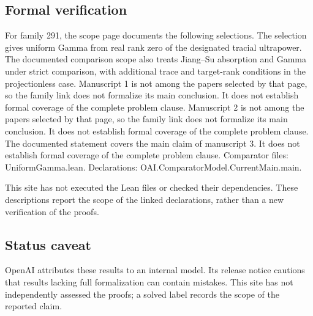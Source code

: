 \documentclass[11pt]{article}
\begin{document}
\subsection{Formal verification}
For family 291, the scope page documents the following selections. The selection gives uniform Gamma from real rank zero of the designated tracial ultrapower. The documented comparison scope also treats Jiang--Su absorption and Gamma under strict comparison, with additional trace and target-rank conditions in the projectionless case. Manuscript 1 is not among the papers selected by that page, so the family link does not formalize its main conclusion. It does not establish formal coverage of the complete problem clause. Manuscript 2 is not among the papers selected by that page, so the family link does not formalize its main conclusion. It does not establish formal coverage of the complete problem clause. The documented statement covers the main claim of manuscript 3. It does not establish formal coverage of the complete problem clause. Comparator files: UniformGamma.lean. Declarations: OAI.ComparatorModel.CurrentMain.main.

This site has not executed the Lean files or checked their dependencies. These descriptions report the scope of the linked declarations, rather than a new verification of the proofs.

\subsection{Status caveat}
OpenAI attributes these results to an internal model. Its release notice cautions that results lacking full formalization can contain mistakes. This site has not independently assessed the proofs; a solved label records the scope of the reported claim.
\end{document}
